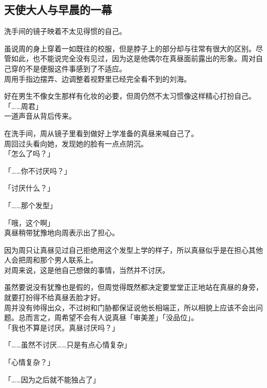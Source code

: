 \subsection{天使大人与早晨的一幕}

洗手间的镜子映着不太见得惯的自己。

虽说周的身上穿着一如既往的校服，但是脖子上的部分却与往常有很大的区别。尽管如此，也不能说完全没有见过，因为这是他偶尔在真昼面前露出的形象。周对自己穿的不是便服这件事感到了不适应。\\

周用手指边摆弄、边调整着视野里已经完全看不到的刘海。

好在男生不像女生那样有化妆的必要，但周仍然不太习惯像这样精心打扮自己。\\

「……周君」\\

一道声音从背后传来。

在洗手间，周从镜子里看到做好上学准备的真昼来喊自己了。\\

周回过头看向她，发现她的脸有一点点阴沉。\\

「怎么了吗？」

「……你不讨厌吗？」

「讨厌什么？」

「……那个发型」

「哦，这个啊」\\

真昼稍带犹豫地向周表示出了担心。

因为周只让真昼见过自己拒绝用这个发型上学的样子，所以真昼似乎是在担心其他人会把周和那个男人联系上。\\

对周来说，这是他自己想做的事情，当然并不讨厌。

虽然要说没有犹豫也是假的，但周觉得既然都决定要堂堂正正地站在真昼的身旁，就要打扮得不给真昼丢脸才好。\\

周并没有帅得出众，不过树和门胁都保证说他长相端正，所以相貌上应该不会出问题。总而言之，周希望不会有人说真昼「审美差」「没品位」。\\

「我也不算是讨厌。真昼讨厌吗？」

「……虽然不讨厌……只是有点心情复杂」

「心情复杂？」

「……因为之后就不能独占了」\\

